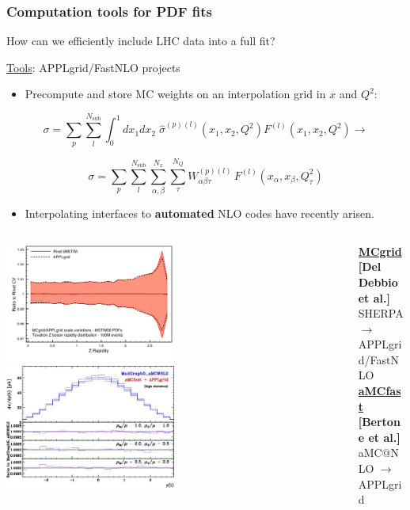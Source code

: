 \documentclass[10pt]{beamer}
\newcommand{\be}{\begin{equation*}}
\newcommand{\ee}{\end{equation*}}
\begin{document}
\begin{frame}
\frametitle{Computation tools for PDF fits}

How can we efficiently include LHC data into a full fit?

\underline{Tools}: APPLgrid/FastNLO projects 

\begin{itemize}
\item<1-> Precompute and store MC weights on an interpolation grid in $x$ and $Q^2$:
\end{itemize}
 \be \sigma= \sum_p \sum_{l}^{N_{\mathrm{sub}}} \int_0^1 dx_1dx_2\; \hat{\sigma}^{(p)(l)} \left( x_1,x_2,Q^2 \right)  F^{(l)}\left(x_1, x_2,  Q^2 \right) \to \ee

\begin{equation}
\label{eq:applconv}
\sigma = \sum_p \sum_{l}^{N_{\mathrm{sub}}} \sum_{\alpha,\beta}^{N_x} \sum_{\tau}^{N_{Q}}
W_{\alpha\beta\tau}^{(p)(l)} \,
F^{(l)}\left(x_{\alpha}, x_{\beta},  Q^2_{\tau}\right)
\end{equation}

\begin{itemize}
\item<1-> Interpolating interfaces to \textbf{automated} NLO codes have recently arisen.
\end{itemize}

\begin{columns}
\begin{column}{0.6\textwidth}
\includegraphics[width=0.50\textwidth]{figures/100MDYMSTWPlot.pdf}
\includegraphics[width=0.50\textwidth]{figures/tt_yt_hs.jpg}
\end{column}
\begin{column}{0.4\textwidth}
\textbf{\underline{MCgrid} [Del Debbio et al.]}\\
{\small SHERPA $\to$ APPLgrid/FastNLO}\\
\vskip10pt
\textbf{\underline{aMCfast} [Bertone et al.]}\\
{\small aMC@NLO $\to$ APPLgrid }

\end{column}
\end{columns}

\end{frame}
\end{document}

